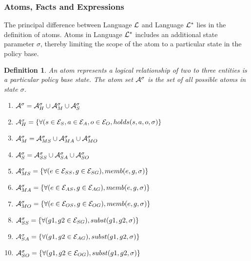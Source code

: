 \documentclass[10pt, twocolumn]{article}
\newtheorem{definition}{Definition}
\begin{document}
      \subsubsection{Atoms, Facts and Expressions}

        The principal difference between Language ${\cal L}$ and Language
        ${\cal L}^{*}$ lies in the definition of atoms. Atoms in Language
        ${\cal L}^{*}$ includes an additional state parameter $\sigma$, thereby
        limiting the scope of the atom to a particular state in the policy
        base.

        \begin{definition}
          An atom represents a logical relationship of two to three entities
          is a particular policy base state. The atom set $\cal{A}^{\sigma}$ is
          the set of all possible atoms in state $\sigma$.

          \begin{enumerate}
            \item
              ${\cal A}^{\sigma} = {\cal A}^{\sigma}_{H} \cup {\cal A}^{\sigma}_{M} \cup {\cal A}^{\sigma}_{S}$
            \item
              ${\cal A}^{\sigma}_{H} = \{\forall (s \in {\cal E}_{S}, a \in {\cal E}_{A}, o \in {\cal E}_{O}, holds(s, a, o, \sigma) \}$
            \item
              ${\cal A}^{\sigma}_{M} = {\cal A}^{\sigma}_{MS} \cup {\cal A}^{\sigma}_{MA} \cup {\cal A}^{\sigma}_{MO}$
            \item
              ${\cal A}^{\sigma}_{S} = {\cal A}^{\sigma}_{SS} \cup {\cal A}^{\sigma}_{SA} \cup {\cal A}^{\sigma}_{SO}$
            \item
              ${\cal A}^{\sigma}_{MS} = \{\forall (e \in {\cal E}_{SS}, g \in {\cal E}_{SG}), memb(e, g, \sigma)\}$
            \item
              ${\cal A}^{\sigma}_{MA} = \{\forall (e \in {\cal E}_{AS}, g \in {\cal E}_{AG}), memb(e, g, \sigma)\}$
            \item
              ${\cal A}^{\sigma}_{MO} = \{\forall (e \in {\cal E}_{OS}, g \in {\cal E}_{OG}), memb(e, g, \sigma)\}$
            \item
              ${\cal A}^{\sigma}_{SS} = \{\forall (g1, g2 \in {\cal E}_{SG}), subst(g1, g2, \sigma)\}$
            \item
              ${\cal A}^{\sigma}_{SA} = \{\forall (g1, g2 \in {\cal E}_{AG}), subst(g1, g2, \sigma)\}$
            \item
              ${\cal A}^{\sigma}_{SO} = \{\forall (g1, g2 \in {\cal E}_{OG}), subst(g1, g2, \sigma)\}$
          \end{enumerate}

        \end{definition} 
\end{document}
